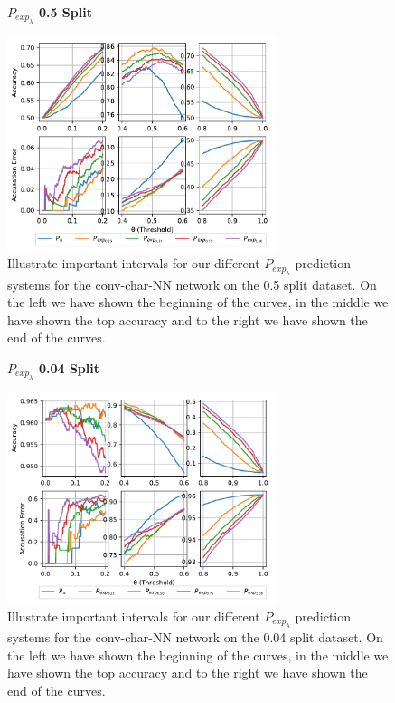\begin{description}
        \begin{figure}
            \centering
            \textbf{$P_{exp_\lambda}$ 0.5 Split}\par\medskip
            \includegraphics[width=0.7\textwidth]{./pictures/discussion/conv_char_nn_prediction_zoom_50_time}
            \caption{Illustrate important intervals for our different
                $P_{exp_\lambda}$ prediction systems for the \gls{conv-char-NN}
                network on the 0.5 split dataset. On the left we have shown the
                beginning of the curves, in the middle we have shown the top
                accuracy and to the right we have shown the end of the curves.}
            \label{fig:conv_char_prediction_zoom_50}
        \end{figure}

        \begin{figure}
            \centering
            \textbf{$P_{exp_\lambda}$ 0.04 Split}\par\medskip
            \includegraphics[width=0.7\textwidth]{./pictures/discussion/conv_char_nn_prediction_zoom_04_time}
            \caption{Illustrate important intervals for our different
                $P_{exp_\lambda}$ prediction systems for the \gls{conv-char-NN}
                network on the 0.04 split dataset. On the left we have shown the
                beginning of the curves, in the middle we have shown the top
                accuracy and to the right we have shown the end of the curves.}
            \label{fig:conv_char_prediction_zoom_04}
        \end{figure}


\end{description}
